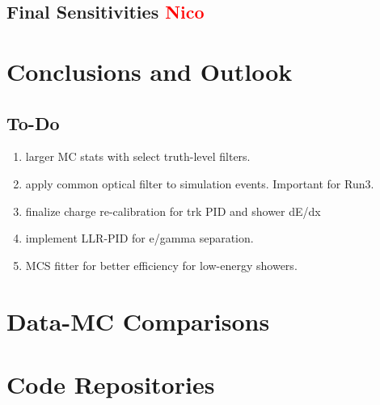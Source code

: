 \documentclass[a4paper]{article}
\begin{document}
\subsection{Final Sensitivities \textcolor{red}{Nico}}

\newpage
\section{Conclusions and Outlook}

\subsection{To-Do}
\begin{enumerate}
    \item larger MC stats with select truth-level filters.
    \item apply common optical filter to simulation events. Important for Run3.
    \item finalize charge re-calibration for trk PID and shower dE/dx
    \item implement LLR-PID for e/gamma separation.
    \item MCS fitter for better efficiency for low-energy showers.

\end{enumerate}{}

\newpage


\appendix

\section{Data-MC Comparisons}

\section{Code Repositories}
\end{document}
